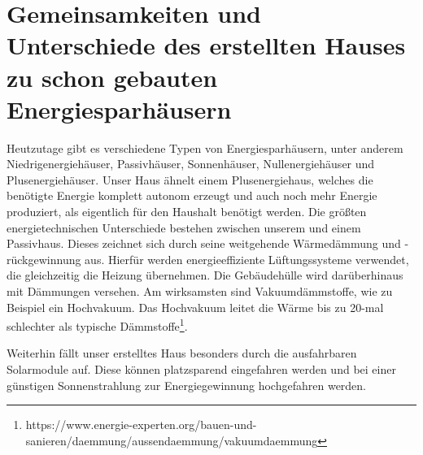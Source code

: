 \section{Gemeinsamkeiten und Unterschiede des erstellten Hauses zu schon gebauten
Energiesparhäusern}
Heutzutage gibt es verschiedene Typen von Energiesparhäusern, unter anderem
Niedrigenergiehäuser, Passivhäuser, Sonnenhäuser, Nullenergiehäuser und Plusenergiehäuser.
Unser Haus ähnelt einem Plusenergiehaus, welches die benötigte Energie komplett autonom
erzeugt und auch noch mehr Energie produziert, als eigentlich für den Haushalt benötigt werden. Die größten energietechnischen Unterschiede bestehen zwischen unserem und einem
Passivhaus. Dieses zeichnet sich durch seine weitgehende Wärmedämmung und -rückgewinnung
aus. Hierfür werden energieeffiziente Lüftungssysteme verwendet, die gleichzeitig die Heizung
übernehmen. Die Gebäudehülle wird darüberhinaus mit Dämmungen versehen. Am wirksamsten
sind Vakuumdämmstoffe, wie zu Beispiel ein Hochvakuum. Das Hochvakuum leitet die Wärme bis
zu 20-mal schlechter als typische Dämmstoffe\footnote{https://www.energie-experten.org/bauen-und-sanieren/daemmung/aussendaemmung/vakuumdaemmung}.
\par
Weiterhin fällt unser erstelltes Haus besonders durch die ausfahrbaren Solarmodule auf. Diese können platzsparend eingefahren werden und bei einer günstigen Sonnenstrahlung zur Energiegewinnung hochgefahren werden.
\newpage

